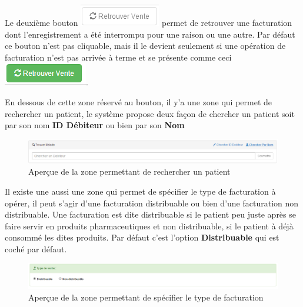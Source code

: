 \documentclass[12pt,a4paper]{report}
\begin{document}
Le deuxième bouton \includegraphics[scale=0.7]{pic/RetrouverVente.png}  permet de retrouver une facturation dont l'enregistrement a été interrompu pour une raison ou une autre. Par défaut ce bouton n'est pas cliquable, mais il le devient seulement si une opération de facturation n'est pas arrivée à terme et se présente comme ceci \includegraphics[scale=0.7]{pic/RetrouverVenteGreen.png}.

En dessous de cette zone réservé au bouton, il y'a une zone qui permet de rechercher un patient, le système propose deux façon de chercher un patient soit par son nom\textbf{ ID Débiteur} ou bien par son \textbf{Nom} 

\begin{figure}[h]
\begin{center}
\includegraphics[width=14cm]{pic/foundPatient.png}
\end{center}
\caption{Aperçue de la zone permettant de rechercher un patient}
\label{Aperçue de la zone permettant de rechercher un patient}
\end{figure}

Il existe une aussi une zone qui permet de spécifier le type de facturation à opérer, il peut s'agir d'une facturation distribuable ou bien d'une facturation non distribuable. Une facturation est dite distribuable si le patient peu juste après se faire servir en produits pharmaceutiques et non distribuable, si le patient à déjà consommé les dites produits. Par défaut c'est l'option \textbf{Distribuable} qui est coché par défaut.  

\begin{figure}[h]
\begin{center}
\includegraphics[width=14cm]{pic/TypeVente.png}
\end{center}
\caption{Aperçue de la zone permettant de spécifier le type de facturation}
\label{Aperçue de la zone permettant de spécifier le type de facturation}
\end{figure}
\end{document}
